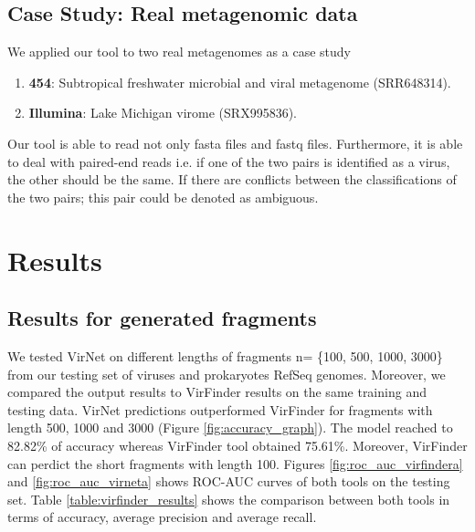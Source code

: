 \subsection{Case Study: Real metagenomic data}
We applied our tool to two real metagenomes as a case study
\begin{enumerate}
	\item \textbf{454}: Subtropical freshwater microbial and viral metagenome (SRR648314).\
	\item \textbf{Illumina}: Lake Michigan virome (SRX995836).
\end{enumerate}
Our tool is able to read not only fasta files and fastq files. Furthermore, it is able to deal with paired-end reads i.e. if one of the two pairs is identified as a virus, the other should be the same. If there are conflicts between the classifications of the two pairs; this pair could be denoted as ambiguous.

\section{Results}
\subsection{Results for generated fragments}
We tested VirNet on different lengths of fragments n= \{100, 500, 1000, 3000\} from our testing set of viruses and prokaryotes RefSeq genomes. Moreover, we compared the output results to VirFinder results on the same training and testing data. VirNet predictions outperformed VirFinder for fragments with length 500, 1000 and 3000 (Figure \ref{fig:accuracy_graph}). The model reached to 82.82\% of accuracy whereas VirFinder tool obtained 75.61\%. Moreover, VirFinder can perdict the short fragments with length 100. Figures \ref{fig:roc_auc_virfindera} and \ref{fig:roc_auc_virneta} shows ROC-AUC curves of both tools on the testing set. Table \ref{table:virfinder_results} shows the comparison between both tools in terms of accuracy, average precision and average recall.


